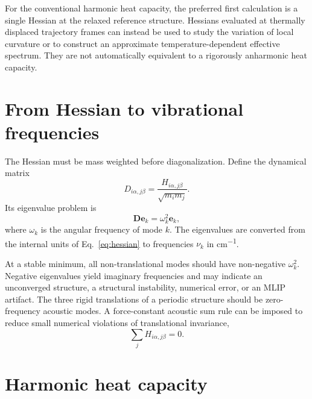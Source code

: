 \documentclass[11pt,a4paper]{article}
\begin{document}
For the conventional harmonic heat capacity, the preferred first calculation is a single Hessian at the relaxed reference structure. Hessians evaluated at thermally displaced trajectory frames can instead be used to study the variation of local curvature or to construct an approximate temperature-dependent effective spectrum. They are not automatically equivalent to a rigorously anharmonic heat capacity.

\section{From Hessian to vibrational frequencies}

The Hessian must be mass weighted before diagonalization. Define the dynamical matrix
\begin{equation}
  D_{i\alpha,j\beta} =
  \frac{H_{i\alpha,j\beta}}{\sqrt{m_i m_j}}.
  \label{eq:dynamical-matrix}
\end{equation}
Its eigenvalue problem is
\begin{equation}
  \bm{D}\bm{e}_k = \omega_k^2\bm{e}_k,
\end{equation}
where $\omega_k$ is the angular frequency of mode $k$. The eigenvalues are converted from the internal units of Eq.~\eqref{eq:hessian} to frequencies $\nu_k$ in \si{cm^{-1}}.

At a stable minimum, all non-translational modes should have non-negative $\omega_k^2$. Negative eigenvalues yield imaginary frequencies and may indicate an unconverged structure, a structural instability, numerical error, or an MLIP artifact. The three rigid translations of a periodic structure should be zero-frequency acoustic modes. A force-constant acoustic sum rule can be imposed to reduce small numerical violations of translational invariance,
\begin{equation}
  \sum_j H_{i\alpha,j\beta} = 0.
\end{equation}

\section{Harmonic heat capacity}
\end{document}
